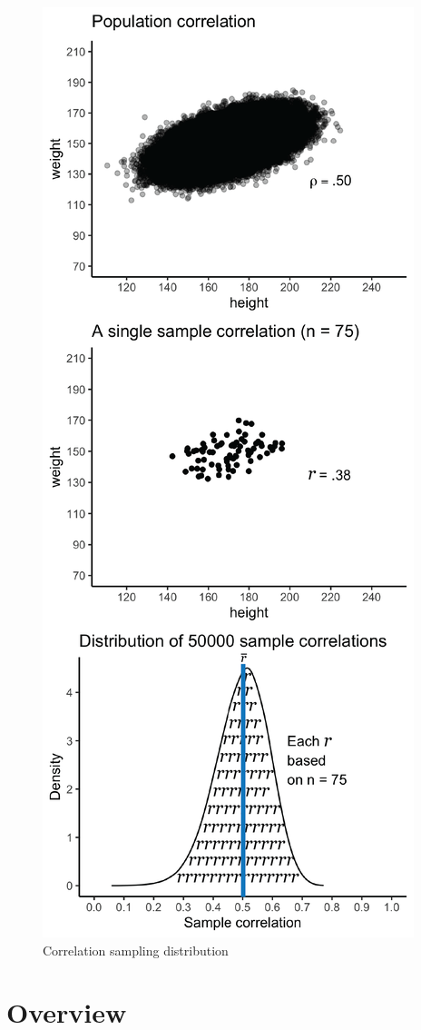 \documentclass[
]{krantz}
\begin{document}
\begin{figure}
\includegraphics[width=0.7\linewidth,height=0.7\textheight]{ch_samples/images/r_sampling_dist_edit} \caption{Correlation sampling distribution}\label{fig:rdistplot}
\end{figure}

\hypertarget{overview-1}{%
\section{Overview}\label{overview-1}}
\end{document}
